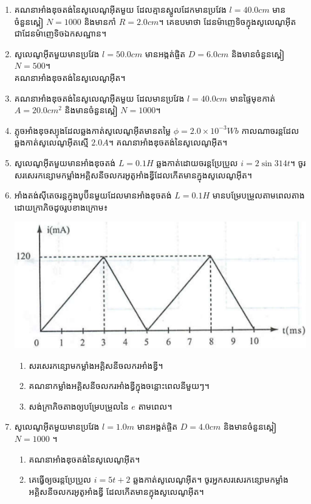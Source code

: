 \documentclass{officialexam}
\begin{document}
	\begin{enumerate}[m]
		\item គណនាអាំងឌុចតង់នៃសូលេណូអុីតមួយ ដែលគ្មានស្នូលដែកមានប្រវែង $l=40.0cm$ មានចំនួនស្ពៀ $N=1000$ និងមានកាំ $R=2.0cm$។ គេឧបមាថា ដែនម៉ាញេទិចក្នុងសូលេណូអុីតជាដែនម៉ាញេទិចឯកសណ្ឋាន។
		\item សូលេណូអុីតមួយមានប្រវែង $l=50.0cm$ មានអង្កត់ផ្ចិត $D=6.0cm$ និងមានចំនួនស្ពៀ $N=500$។\\ គណនាអាំងឌុចតង់នៃសូលេណូអុីត។
		\item គណនាអាំងឌុចតង់នៃសូលេណូអុីតមួយ ដែលមានប្រវែង $l=40.0cm$ មានផ្ទៃមុខកាត់ $A=20.0cm^2$ និងមានចំនួនស្ពៀ $N=1000$។
		\item ភ្លុចអាំងឌុចស្យុងដែលឆ្លងកាត់សូលេណូអុីតមានតម្លៃ $\phi = 2.0\times10^{-3}Wb$ កាលណាចរន្តដែលឆ្លងកាត់សូលេណូអុីតស្មើ $2.0A$។ គណនាអាំងឌុចតង់នៃសូលេណូអុីត។
		\item សូលេណូអុីតមួយមានអាំងឌុចតង់ $L=0.1H$ ឆ្លងកាត់ដោយចរន្តប្រែប្រួល $i=2\sin314t$។ ចូរសរសេរកន្សោមកម្លាំងអគ្គិសនីចលករអូតូអាំងឌ្វីដែលកើតមានក្នុងសូលេណូអុីត។
		\item អាំងតង់សុីតេចរន្តក្នុងបូប៊ីនមួយដែលមានអាំងឌុចតង់ $L=0.1H$ មានបម្រែបម្រួលតាមពេលតាងដោយក្រាភិចដូចរូបខាងក្រោម៖
			\begin{center}
				\includegraphics[scale=0.6]{pic1}
			\end{center}
			\begin{enumerate}[k]
				\item សរសេរកន្សោមកម្លាំងអគ្គិសនីចលករអាំងឌ្វី។
				\item គណនាកម្លាំងអគ្គិសនីចលករអាំងឌ្វីក្នុងចន្លោះពេលនីមួយៗ។
				\item សង់ក្រាភិចតាងឲ្យបម្រែបម្រួលនៃ $e$ តាមពេល។
			\end{enumerate}
		\item សូលេណូអុីតមួយមានប្រវែង $l=1.0m$ មានអង្គត់ផ្ចិត $D=4.0cm$ និងមានចំនួនស្ពៀ $N=1000$ ។
		\begin{enumerate}[k]
			\item គណនាអាំងឌុចតង់នៃសូលេណូអុីត។
			\item  គេធ្វើឲ្យចរន្តប្រែប្រួល $i=5t+2$ ឆ្លងកាត់សូលេណូអុីត។ ចូរអ្នកសរសេរកន្សោមកម្លាំងអគ្គិសនីចលករអូតូអាំងឌ្វី ដែលកើតមានក្នុងសូលេណូអុីត។

\end{enumerate}
\end{enumerate}
\end{document}
